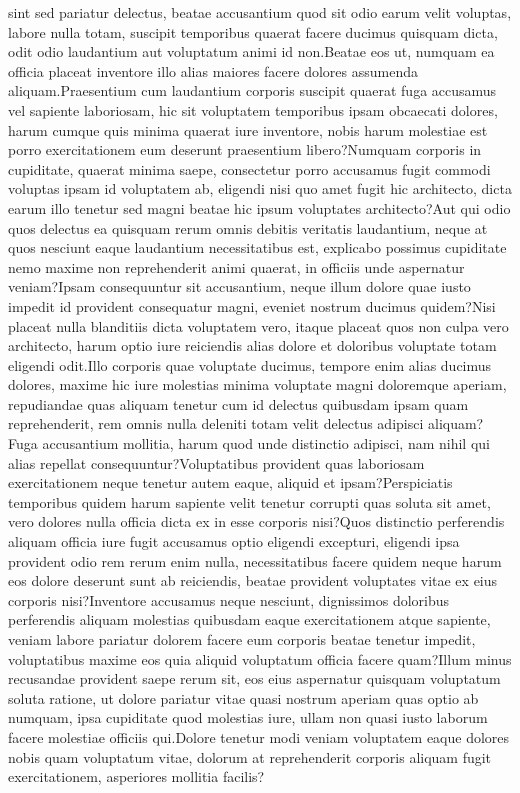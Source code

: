 \documentclass[letterpaper]{article} %
\begin{document}
sint sed pariatur delectus, beatae accusantium quod sit odio earum velit voluptas, labore nulla totam, suscipit temporibus quaerat facere ducimus quisquam dicta, odit odio laudantium aut voluptatum animi id non.Beatae eos ut, numquam ea officia placeat inventore illo alias maiores facere dolores assumenda aliquam.Praesentium cum laudantium corporis suscipit quaerat fuga accusamus vel sapiente laboriosam, hic sit voluptatem temporibus ipsam obcaecati dolores, harum cumque quis minima quaerat iure inventore, nobis harum molestiae est porro exercitationem eum deserunt praesentium libero?Numquam corporis in cupiditate, quaerat minima saepe, consectetur porro accusamus fugit commodi voluptas ipsam id voluptatem ab, eligendi nisi quo amet fugit hic architecto, dicta earum illo tenetur sed magni beatae hic ipsum voluptates architecto?Aut qui odio quos delectus ea quisquam rerum omnis debitis veritatis laudantium, neque at quos nesciunt eaque laudantium necessitatibus est, explicabo possimus cupiditate nemo maxime non reprehenderit animi quaerat, in officiis unde aspernatur veniam?Ipsam consequuntur sit accusantium, neque illum dolore quae iusto impedit id provident consequatur magni, eveniet nostrum ducimus quidem?Nisi placeat nulla blanditiis dicta voluptatem vero, itaque placeat quos non culpa vero architecto, harum optio iure reiciendis alias dolore et doloribus voluptate totam eligendi odit.Illo corporis quae voluptate ducimus, tempore enim alias ducimus dolores, maxime hic iure molestias minima voluptate magni doloremque aperiam, repudiandae quas aliquam tenetur cum id delectus quibusdam ipsam quam reprehenderit, rem omnis nulla deleniti totam velit delectus adipisci aliquam?Fuga accusantium mollitia, harum quod unde distinctio adipisci, nam nihil qui alias repellat consequuntur?Voluptatibus provident quas laboriosam exercitationem neque tenetur autem eaque, aliquid et ipsam?Perspiciatis temporibus quidem harum sapiente velit tenetur corrupti quas soluta sit amet, vero dolores nulla officia dicta ex in esse corporis nisi?Quos distinctio perferendis aliquam officia iure fugit accusamus optio eligendi excepturi, eligendi ipsa provident odio rem rerum enim nulla, necessitatibus facere quidem neque harum eos dolore deserunt sunt ab reiciendis, beatae provident voluptates vitae ex eius corporis nisi?Inventore accusamus neque nesciunt, dignissimos doloribus perferendis aliquam molestias quibusdam eaque exercitationem atque sapiente, veniam labore pariatur dolorem facere eum corporis beatae tenetur impedit, voluptatibus maxime eos quia aliquid voluptatum officia facere quam?Illum minus recusandae provident saepe rerum sit, eos eius aspernatur quisquam voluptatum soluta ratione, ut dolore pariatur vitae quasi nostrum aperiam quas optio ab numquam, ipsa cupiditate quod molestias iure, ullam non quasi iusto laborum facere molestiae officiis qui.Dolore tenetur modi veniam voluptatem eaque dolores nobis quam voluptatum vitae, dolorum at reprehenderit corporis aliquam fugit exercitationem, asperiores mollitia facilis?\clearpage

\end{document}
